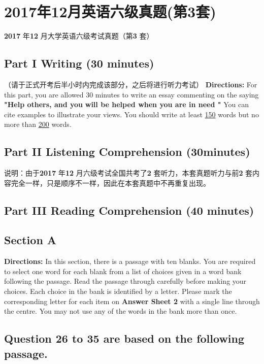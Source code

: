 \documentclass[UTF8,11pt]{ctexart}
\begin{document}
\section*{2017年12月英语六级真题(第3套)}
\textbf{2017} 年\textbf{12} 月大学英语六级考试真题（第\textbf{3} 套）


\subsection*{\textbf{Part I} \textbf{Writing} \textbf{(30 minutes)}}


（请于正式开考后半小时内完成该部分，之后将进行听力考试） \textbf{Directions:} For this part, you are allowed 30 minutes to write an essay commenting on the saying\textbf{ "Help others, and you} \textbf{will be helped when you are in need "} You can cite examples to illustrate your views. You should write at least \uline{150} words but no more than \uline{200} words.


\subsection*{\textbf{Part II} \textbf{Listening Comprehension} \textbf{(30minutes)}}


说明：由于\textbf{2017} 年\textbf{12} 月六级考试全国共考了\textbf{2} 套听力，本套真题听力与前\textbf{2} 套内容完全一样，只是顺序不一样，因此在本套真题中不再重复出现。


\subsection*{\textbf{Part III} \textbf{Reading} Comprehension (40 minutes)}


\subsection*{\textbf{Section A}}


\textbf{Directions:} In this section, there is a passage with ten blanks. You are required to select one word for each blank from a list of choices given in a word bank following the passage. Read the passage through carefully before making your choices. Each choice in the bank is identified by a letter. Please mark the corresponding letter for each item on\textbf{ Answer Sheet 2} with a single line through the centre. You may not use any of the words in the bank more than once.


\subsection*{\textbf{Question 26 to 35 are based on the following passage.}}
\end{document}
